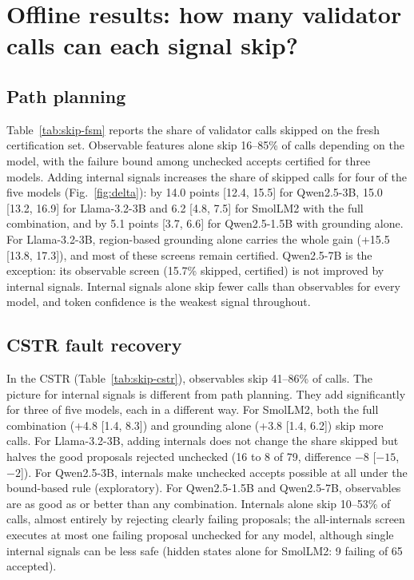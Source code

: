 \section{Offline results: how many validator calls can each signal skip?}\label{sec:results}

\subsection{Path planning}
Table~\ref{tab:skip-fsm} reports the share of validator calls skipped on the fresh certification set. Observable
features alone skip 16--85\% of calls depending on the model, with the failure bound among unchecked accepts
certified for three models. Adding internal signals increases the share of skipped calls for four of the five models
(Fig.~\ref{fig:delta}): by 14.0 points [12.4, 15.5] for Qwen2.5-3B, 15.0 [13.2, 16.9] for Llama-3.2-3B and 6.2 [4.8,
7.5] for SmolLM2 with the full combination, and by 5.1 points [3.7, 6.6] for Qwen2.5-1.5B with grounding alone. For
Llama-3.2-3B, region-based grounding alone carries the whole gain (+15.5 [13.8, 17.3]), and most of these screens
remain certified. Qwen2.5-7B is the exception: its observable screen (15.7\% skipped, certified) is not improved by
internal signals. Internal signals alone skip fewer calls than observables for every model, and token confidence is
the weakest signal throughout.



\subsection{CSTR fault recovery}
In the CSTR (Table~\ref{tab:skip-cstr}), observables skip 41--86\% of calls. The picture for internal signals is
different from path planning. They add significantly for three of five models, each in a different way. For
SmolLM2, both the full combination (+4.8 [1.4, 8.3]) and grounding alone (+3.8 [1.4, 6.2]) skip more calls. For
Llama-3.2-3B, adding internals does not change the share skipped but halves the good proposals rejected unchecked
(16 to 8 of 79, difference $-8$ [$-15$, $-2$]). For Qwen2.5-3B, internals make unchecked accepts possible at all under
the bound-based rule (exploratory). For Qwen2.5-1.5B and Qwen2.5-7B, observables are as good as or better than any
combination. Internals alone skip 10--53\% of calls, almost entirely by rejecting clearly failing proposals; the
all-internals screen executes at most one failing proposal unchecked for any model, although single internal signals
can be less safe (hidden states alone for SmolLM2: 9 failing of 65 accepted).

